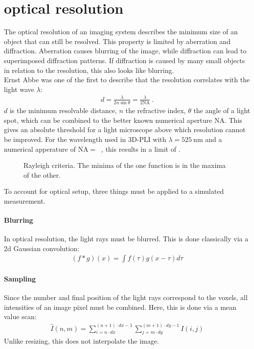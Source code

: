 \section{optical resolution}
\label{sec:opticalResolution}
% 
The optical resolution of an imaging system describes the minimum size of an object that can still be resolved.
This property is limited by aberration and diffraction.
Aberration causes blurring of the image, while diffraction can lead to superimposed diffraction patterns.
If diffraction is caused by many small objects in relation to the resolution, this also looks like blurring.
\\
% 
Ernst Abbe was one of the first to describe that the resolution correlates with the light wave $\lambda$: 
\begin{align}
d=\frac{ \lambda}{2 n \sin \theta} = \frac{\lambda}{2\mathrm{NA}} \> .
\end{align}
$d$ is the minimum resolvable distance, $n$ the refractive index, $\theta$ the angle of a light spot, which can be combined to the better known numerical aperture $\mathrm{NA}$.
This gives an absolute threshold for a light microscope above which resolution cannot be improved.
For the wavelength used in \ac{3D-PLI} with $\lambda = \SI{525}{\nano\meter}$ and a numerical apperature of $\mathrm{NA} = \SI{}{}$ \dummy{}, this results in a limit of \dummy{}.
% 
\begin{figure}[!t]
\setlength{\tikzwidth}{0.45\textwidth}
\centering
\caption[Raylay criterium]{Rayleigh criteria. The minima of the one function is in the maxima of the other.}
\label{fig:rayleigh}
\end{figure}
% 
% 
To account for optical setup, three things must be applied to a simulated measurement.
% 
\paragraph{Blurring}
In optical resolution, the light rays must be blurred.
This is done classically via a 2d Gaussian convolution:
\begin{align}
    (f * g)(x) = \int f(\tau)g(x-\tau)d\tau
\end{align}
% 
\paragraph{Sampling}
Since the number and final position of the light rays correspond to the voxels, all intensities of an image pixel must be combined.
Here, this is done via a mean value scan:
\begin{align}
    \hat{I}(n,m) = \sum_{i=n \cdot dx}^{(n+1) \cdot dx-1}\sum_{j=m \cdot dy}^{(m+1) \cdot dy-1} I(i,j)
\end{align}
Unlike resizing, this does not interpolate the image.
% 
